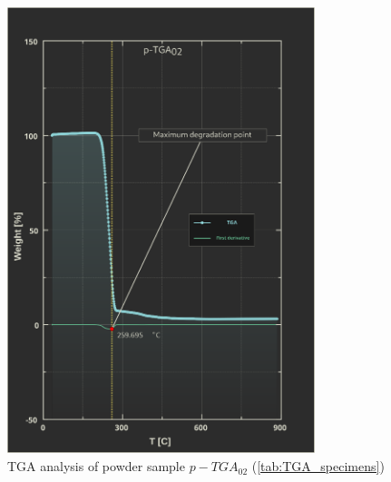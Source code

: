 \documentclass{article}
\begin{document}
        \begin{figure}[h!]
            \centering
            \includegraphics[width=0.8\textwidth]{Pictures/Thermal_analysis_plots/TGA_catalogued/p-TGA02.eps}
            \caption{TGA analysis of powder sample $p-TGA_{02}$ (\ref{tab:TGA_specimens})}
            \label{fig:TGA_02}
        \end{figure}
\end{document}
